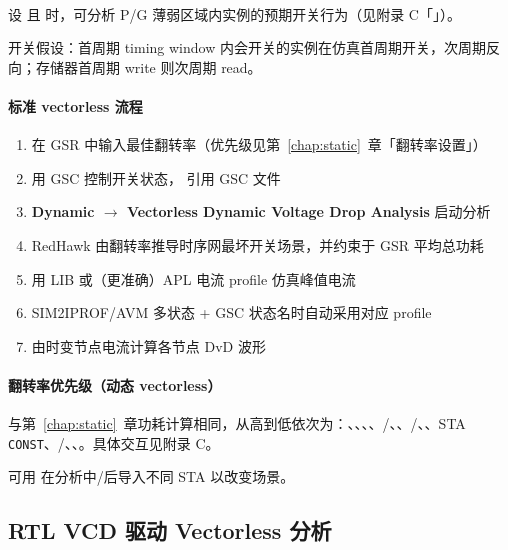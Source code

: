 \paragraph{}
设  且  时，可分析 P/G 薄弱区域内实例的预期开关行为（见附录 C「」）。

开关假设：首周期 timing window 内会开关的实例在仿真首周期开关，次周期反向；存储器首周期 write 则次周期 read。

\paragraph{标准 vectorless 流程}
\begin{enumerate}
  \item 在 GSR 中输入最佳翻转率（优先级见第~\ref{chap:static}~章「翻转率设置」）
  \item 用 GSC 控制开关状态， 引用 GSC 文件
  \item \textbf{Dynamic $\rightarrow$ Vectorless Dynamic Voltage Drop Analysis} 启动分析
  \item RedHawk 由翻转率推导时序网最坏开关场景，并约束于 GSR 平均总功耗
  \item 用 LIB 或（更准确）APL 电流 profile 仿真峰值电流
  \item SIM2IPROF/AVM 多状态 + GSC 状态名时自动采用对应 profile
  \item 由时变节点电流计算各节点 DvD 波形
\end{enumerate}

\paragraph{翻转率优先级（动态 vectorless）}
与第~\ref{chap:static}~章功耗计算相同，从高到低依次为：、、、、/、、/、、STA \texttt{CONST}、/、、。具体交互见附录 C。

\begin{noteBox}
可用  在分析中/后导入不同 STA 以改变场景。
\end{noteBox}

\subsection{RTL VCD 驱动 Vectorless 分析}
